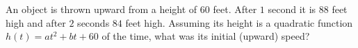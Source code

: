 An object is thrown upward from a height of $60$ feet. After $1$ second it is $88$ feet high and after $2$ seconds $84$ feet high. Assuming its height is a quadratic function $h(t)=at^2+bt+60$ of the time, what was its initial (upward) speed?
